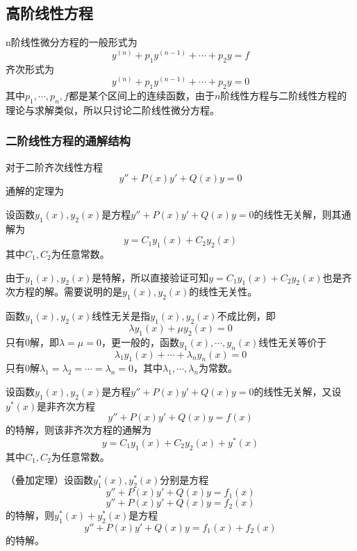 \subsection{高阶线性方程}
n阶线性微分方程的一般形式为
\[ y^{(n)} + p_1y^{(n-1)} + \cdots + p_2y = f \]
齐次形式为
\[ y^{(n)} + p_1y^{(n-1)} + \cdots + p_2y = 0 \]
其中$p_1,\cdots,p_n,f$都是某个区间上的连续函数，由于$n$阶线性方程与二阶线性方程的理论与求解类似，所以只讨论二阶线性微分方程。
\subsubsection{二阶线性方程的通解结构}
对于二阶齐次线性方程
\[ y'' + P(x)y' + Q(x)y = 0 \]
通解的定理为
\begin{theorem}
    设函数$y_1(x),y_2(x)$是方程$y''+P(x)y'+Q(x)y=0$的线性无关解，则其通解为
    \[ y = C_1y_1(x) + C_2y_2(x) \]
    其中$C_1,C_2$为任意常数。
\end{theorem}

由于$y_1(x),y_2(x)$是特解，所以直接验证可知$y = C_1y_1(x) + C_2y_2(x)$也是齐次方程的解。需要说明的是$y_1(x),y_2(x)$的线性无关性。

函数$y_1(x),y_2(x)$线性无关是指$y_1(x),y_2(x)$不成比例，即
\[ \lambda y_1(x)+\mu y_2(x) = 0 \]
只有$0$解，即$\lambda = \mu = 0$，更一般的，函数$y_1(x),\cdots,y_n(x)$线性无关等价于
\[ \lambda_1y_1(x) + \cdots + \lambda_ny_n(x) = 0 \]
只有$0$解$\lambda_1=\lambda_2=\cdots=\lambda_n = 0$，其中$\lambda_1,\cdots,\lambda_n$为常数。

\begin{theorem}
    设函数$y_1(x),y_2(x)$是方程$y''+P(x)y'+Q(x)y=0$的线性无关解，又设$y^*(x)$是非齐次方程
    \[ y'' + P(x)y' + Q(x)y = f(x) \]
    的特解，则该非齐次方程的通解为
    \[ y = C_1y_1(x) + C_2y_2(x) + y^*(x) \]
    其中$C_1, C_2$为任意常数。
\end{theorem}

\begin{theorem}
    （叠加定理）设函数$y_1^*(x), y_2^*(x)$分别是方程
    \[ y'' + P(x)y' + Q(x)y = f_1(x) \]
    \[ y'' + P(x)y' + Q(x)y = f_2(x) \]
    的特解，则$y_1^*(x)+y_2^*(x)$是方程
    \[ y'' + P(x)y' + Q(x)y = f_1(x) + f_2(x) \]
    的特解。
\end{theorem}

